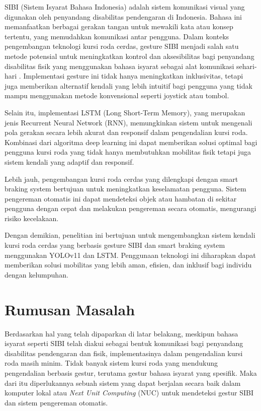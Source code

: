 SIBI (Sistem Isyarat Bahasa Indonesia) adalah sistem komunikasi visual yang digunakan oleh penyandang disabilitas pendengaran di Indonesia. Bahasa ini memanfaatkan berbagai gerakan tangan untuk mewakili kata atau konsep tertentu, yang memudahkan komunikasi antar pengguna\cite{Rani2019}. Dalam konteks pengembangan teknologi kursi roda cerdas, gesture SIBI menjadi salah satu metode potensial untuk meningkatkan kontrol dan aksesibilitas bagi penyandang disabilitas fisik yang menggunakan bahasa isyarat sebagai alat komunikasi sehari-hari . Implementasi gesture ini tidak hanya meningkatkan inklusivitas, tetapi juga memberikan alternatif kendali yang lebih intuitif bagi pengguna yang tidak mampu menggunakan metode konvensional seperti joystick atau tombol.

Selain itu, implementasi LSTM (Long Short-Term Memory), yang merupakan jenis Recurrent Neural Network (RNN), memungkinkan sistem untuk mengenali pola gerakan secara lebih akurat dan responsif dalam pengendalian kursi roda\cite{Graves2019}. Kombinasi dari algoritma deep learning ini dapat memberikan solusi optimal bagi pengguna kursi roda yang tidak hanya membutuhkan mobilitas fisik tetapi juga sistem kendali yang adaptif dan responsif.

Lebih jauh, pengembangan kursi roda cerdas yang dilengkapi dengan smart braking system bertujuan untuk meningkatkan keselamatan pengguna. Sistem pengereman otomatis ini dapat mendeteksi objek atau hambatan di sekitar pengguna dengan cepat dan melakukan pengereman secara otomatis, mengurangi risiko kecelakaan.

Dengan demikian, penelitian ini bertujuan untuk mengembangkan sistem kendali kursi roda cerdas yang berbasis gesture SIBI dan smart braking system menggunakan YOLOv11 dan LSTM. Penggunaan teknologi ini diharapkan dapat memberikan solusi mobilitas yang lebih aman, efisien, dan inklusif bagi individu dengan kelumpuhan.
\section{Rumusan Masalah}
Berdasarkan hal yang telah dipaparkan di latar belakang, meskipun bahasa isyarat seperti SIBI telah diakui sebagai bentuk komunikasi bagi penyandang disabilitas pendengaran dan fisik, implementasinya dalam pengendalian kursi roda masih minim. Tidak banyak sistem kursi roda yang mendukung pengendalian berbasis gestur, terutama gestur bahasa isyarat yang spesifik. Maka dari itu diperlukannya sebuah sistem yang dapat berjalan secara baik dalam komputer lokal atau \emph{Next Unit Computing} (NUC) untuk mendeteksi gestur SIBI dan sistem pengereman otomatis.

